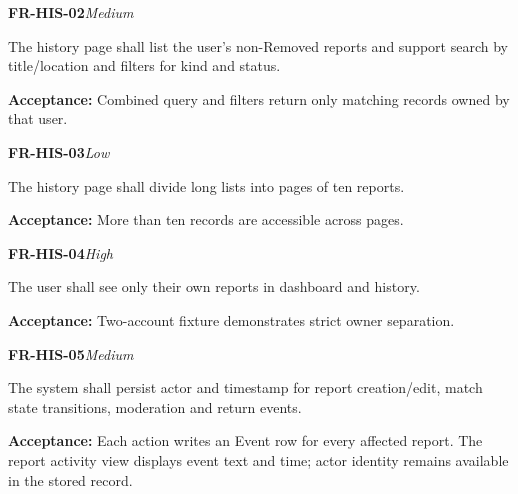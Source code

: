 \documentclass[12pt,a4paper,oneside]{report}
\begin{document}
\noindent\begin{minipage}{\linewidth}\textbf{FR-HIS-02}\hfill\textit{Medium}\par\nopagebreak

The history page shall list the user's non-Removed reports and support search by title/location and filters for kind and status.

{\color{muted}\textbf{Acceptance:} Combined query and filters return only matching records owned by that user.\par}\end{minipage}\par\vspace{5pt}

\noindent\begin{minipage}{\linewidth}\textbf{FR-HIS-03}\hfill\textit{Low}\par\nopagebreak

The history page shall divide long lists into pages of ten reports.

{\color{muted}\textbf{Acceptance:} More than ten records are accessible across pages.\par}\end{minipage}\par\vspace{5pt}

\noindent\begin{minipage}{\linewidth}\textbf{FR-HIS-04}\hfill\textit{High}\par\nopagebreak

The user shall see only their own reports in dashboard and history.

{\color{muted}\textbf{Acceptance:} Two-account fixture demonstrates strict owner separation.\par}\end{minipage}\par\vspace{5pt}

\noindent\begin{minipage}{\linewidth}\textbf{FR-HIS-05}\hfill\textit{Medium}\par\nopagebreak

The system shall persist actor and timestamp for report creation/edit, match state transitions, moderation and return events.

{\color{muted}\textbf{Acceptance:} Each action writes an Event row for every affected report. The report activity view displays event text and time; actor identity remains available in the stored record.\par}\end{minipage}\par\vspace{5pt}
\end{document}
